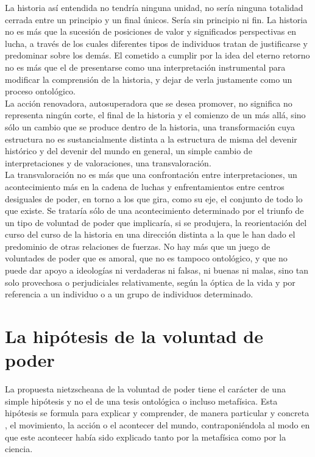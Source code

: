 \documentclass[a4paper, 10pt, twocolumn, spanish]{article}
\begin{document}
La historia así entendida no tendría ninguna unidad, no sería ninguna
totalidad cerrada entre un principio y un final únicos. Sería sin
principio ni fin. La historia no es más que la sucesión de posiciones
de valor y significados perspectivas en lucha, a través de los cuales
diferentes tipos de individuos tratan de justificarse y predominar
sobre los demás. El cometido a cumplir por la idea del eterno retorno
no es más que el de presentarse como una interpretación instrumental
para modificar la comprensión de la historia, y dejar de verla
justamente como un proceso ontológico.\\[0pt]

La acción renovadora, autosuperadora que se desea promover, no
significa no representa ningún corte, el final de la historia y el
comienzo de un más allá, sino sólo un cambio que se produce dentro de
la historia, una transformación cuya estructura no es sustancialmente
distinta a la estructura de misma del devenir histórico y del devenir
del mundo en general, un simple cambio de interpretaciones y de
valoraciones, una transvaloración.\\[0pt]

La transvaloración no es más que una confrontación entre
interpretaciones, un acontecimiento más en la cadena de luchas y
enfrentamientos entre centros desiguales de poder, en torno a los que
gira, como su eje, el conjunto de todo lo que existe. Se trataría sólo
de una acontecimiento determinado por el triunfo de un tipo de
voluntad de poder que implicaría, si se produjera, la reorientación
del curso del curso de la historia en una dirección distinta a la que
le han dado el predominio de otras relaciones de fuerzas. No hay más
que un juego de voluntades de poder que es amoral, que no es tampoco
ontológico, y que no puede dar apoyo a ideologías ni verdaderas ni
falsas, ni buenas ni malas, sino tan solo provechosa o perjudiciales
relativamente, según la óptica de la vida y por referencia a un
individuo o a un grupo de individuos determinado.\\[0pt]

\section{La hipótesis de la voluntad de poder}
\label{sec:org0179e2a}
La propuesta nietzscheana de la voluntad de poder tiene el carácter de
una simple hipótesis y no el de una tesis ontológica o incluso
metafísica. Esta hipótesis se formula para explicar y comprender, de
manera particular y concreta , el movimiento, la acción o el acontecer
del mundo, contraponiéndola al modo en que este acontecer había sido
explicado tanto por la metafísica como por la ciencia.\\[0pt]
\end{document}

